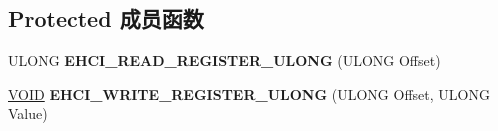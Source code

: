 \subsection*{Protected 成员函数}
\begin{DoxyCompactItemize}
\item 
\mbox{\label{class_c_u_s_b_hardware_device_a0abbc18ef0e1a6d76d8979561c232f9e}} 
U\+L\+O\+NG {\bfseries E\+H\+C\+I\+\_\+\+R\+E\+A\+D\+\_\+\+R\+E\+G\+I\+S\+T\+E\+R\+\_\+\+U\+L\+O\+NG} (U\+L\+O\+NG Offset)
\item 
\mbox{\label{class_c_u_s_b_hardware_device_a878ee1b63c92507bb1806892443b6803}} 
\hyperlink{interfacevoid}{V\+O\+ID} {\bfseries E\+H\+C\+I\+\_\+\+W\+R\+I\+T\+E\+\_\+\+R\+E\+G\+I\+S\+T\+E\+R\+\_\+\+U\+L\+O\+NG} (U\+L\+O\+NG Offset, U\+L\+O\+NG Value)
\end{DoxyCompactItemize}
